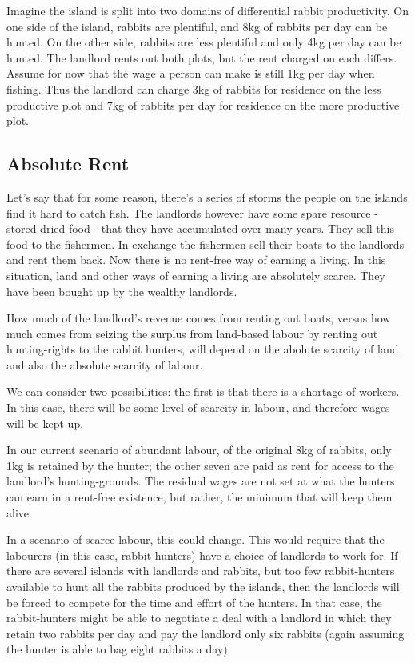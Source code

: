 \documentclass[]{tufte-handout}
\begin{document}
Imagine the island is split into two domains of differential rabbit
productivity. On one side of the island, rabbits are plentiful, and 8kg
of rabbits per day can be hunted. On the other side, rabbits are less
plentiful and only 4kg per day can be hunted. The landlord rents out
both plots, but the rent charged on each differs. Assume for now that
the wage a person can make is still 1kg per day when fishing. Thus the
landlord can charge 3kg of rabbits for residence on the less productive
plot and 7kg of rabbits per day for residence on the more productive
plot.

\hypertarget{absolute-rent}{%
\subsection{Absolute Rent}\label{absolute-rent}}

Let's say that for some reason, there's a series of storms the people on
the islands find it hard to catch fish. The landlords however have some
spare resource - stored dried food - that they have accumulated over
many years. They sell this food to the fishermen. In exchange the
fishermen sell their boats to the landlords and rent them back. Now
there is no rent-free way of earning a living. In this situation, land
and other ways of earning a living are absolutely scarce. They have been
bought up by the wealthy landlords.

How much of the landlord's revenue comes from renting out boats, versus
how much comes from seizing the surplus from land-based labour by
renting out hunting-rights to the rabbit hunters, will depend on the
abolute scarcity of land and also the absolute scarcity of labour.

We can consider two possibilities: the first is that there is a shortage
of workers. In this case, there will be some level of scarcity in
labour, and therefore wages will be kept up.

In our current scenario of abundant labour, of the original 8kg of
rabbits, only 1kg is retained by the hunter; the other seven are paid as
rent for access to the landlord's hunting-grounds. The residual wages
are not set at what the hunters can earn in a rent-free existence, but
rather, the minimum that will keep them alive.

In a scenario of scarce labour, this could change. This would require
that the labourers (in this case, rabbit-hunters) have a choice of
landlords to work for. If there are several islands with landlords and
rabbits, but too few rabbit-hunters available to hunt all the rabbits
produced by the islands, then the landlords will be forced to compete
for the time and effort of the hunters. In that case, the rabbit-hunters
might be able to negotiate a deal with a landlord in which they retain
two rabbits per day and pay the landlord only six rabbits (again
assuming the hunter is able to bag eight rabbits a day).
\end{document}
